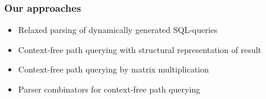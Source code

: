 \documentclass[xcolor=table]{beamer}
\begin{document}
\begin{frame}
  \transwipe[direction=90]
  \frametitle{Our approaches}
  \begin{itemize}
    \item Relaxed parsing of dynamically generated SQL-queries %
    \item Context-free path querying with structural representation of result %
    \item Context-free path querying by matrix multiplication %
    \item Parser combinators for context-free path querying %
  \end{itemize}
\end{frame}
\end{document}
